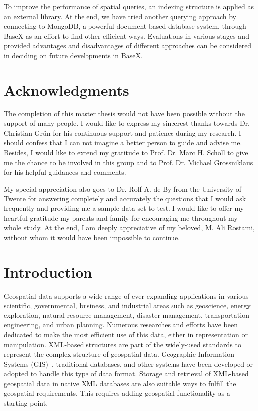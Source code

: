 \documentclass[a4paper,12pt]{article}
\begin{document}
To improve the performance of spatial queries, an indexing structure is applied as an external library.
At the end, we have tried another querying approach by connecting to MongoDB, a powerful document-based database system, through BaseX as an effort to find other efficient ways.
Evaluations in various stages and provided advantages and disadvantages of different approaches can be considered in deciding on future developments in BaseX.
\thispagestyle{empty}

\newpage
\section*{Acknowledgments}
\thispagestyle{empty}

The completion of this master thesis would not have been possible 
without the support of many people. 
I would like to express my sincerest thanks towards 
Dr. Christian Gr{\"u}n for his continuous support and patience during my research.
I should confess that I can not imagine a better person to guide and advise me. Besides, I would like to extend my gratitude to Prof. Dr. Marc H. Scholl to give me the chance to be involved in this group and to Prof. Dr. Michael Grossniklaus for his helpful guidances and comments.

My special appreciation also goes to Dr. Rolf A. de By from the University of Twente for
answering completely and accurately the questions that I would ask
frequently and providing me a sample data set to test. I would like to offer my heartful gratitude my parents and family for encouraging me 
throughout my whole study. At the end, I am deeply appreciative of my beloved, M. Ali Rostami, without whom it would have been impossible to continue.


\newpage
\tableofcontents

\thispagestyle{empty}
\newpage
\section{Introduction}
\setcounter{page}{1}
Geospatial data supports a wide range of ever-expanding applications in various scientific, governmental, business, and industrial areas such as geoscience, energy exploration, natural resource management, disaster management, transportation engineering, and urban planning. 
Numerous researches and efforts have been dedicated to make the most efficient use of this data, either in representation or manipulation. 
XML-based structures are part of the widely-used standards to represent the complex structure of geospatial data. 
Geographic Information Systems (GIS)~\cite{gis-intro}, traditional databases, and other systems have been developed or adopted to handle this type of data format. 
Storage and retrieval of XML-based geospatial data in native XML databases are also suitable ways to fulfill the geospatial requirements. This requires adding geospatial functionality as a starting point.
\end{document}

